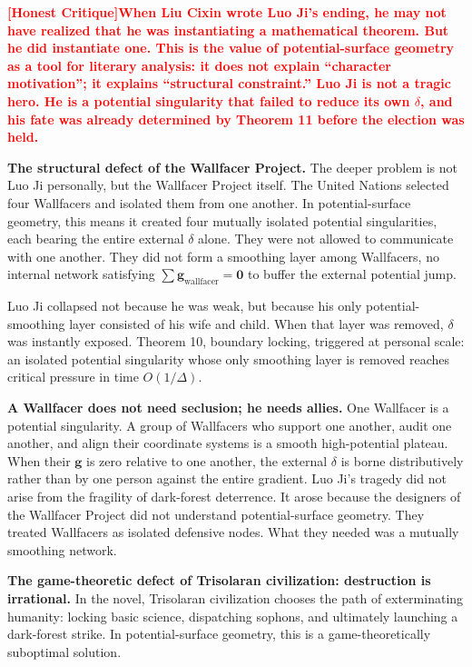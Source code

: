 \documentclass[12pt,a4paper]{article}
\theoremstyle{remark}
\newcommand{\honestcrit}[1]{%
    \textcolor{red}{\textbf{[Honest Critique]#1}}%
}
\begin{document}
\honestcrit{When Liu Cixin wrote Luo Ji's ending, he may not have realized that he was instantiating a mathematical theorem. But he did instantiate one. This is the value of potential-surface geometry as a tool for literary analysis: it does not explain ``character motivation''; it explains ``structural constraint.'' Luo Ji is not a tragic hero. He is a potential singularity that failed to reduce its own $\delta$, and his fate was already determined by Theorem 11 before the election was held.}

\textbf{The structural defect of the Wallfacer Project.} The deeper problem is not Luo Ji personally, but the Wallfacer Project itself. The United Nations selected four Wallfacers and isolated them from one another. In potential-surface geometry, this means it created four mutually isolated potential singularities, each bearing the entire external $\delta$ alone. They were not allowed to communicate with one another. They did not form a smoothing layer among Wallfacers, no internal network satisfying $\sum\mathbf{g}_{\text{wallfacer}} = \mathbf{0}$ to buffer the external potential jump.

Luo Ji collapsed not because he was weak, but because his only potential-smoothing layer consisted of his wife and child. When that layer was removed, $\delta$ was instantly exposed. Theorem 10, boundary locking, triggered at personal scale: an isolated potential singularity whose only smoothing layer is removed reaches critical pressure in time $O(1/\Delta)$.

\textbf{A Wallfacer does not need seclusion; he needs allies.} One Wallfacer is a potential singularity. A group of Wallfacers who support one another, audit one another, and align their coordinate systems is a smooth high-potential plateau. When their $\mathbf{g}$ is zero relative to one another, the external $\delta$ is borne distributively rather than by one person against the entire gradient. Luo Ji's tragedy did not arise from the fragility of dark-forest deterrence. It arose because the designers of the Wallfacer Project did not understand potential-surface geometry. They treated Wallfacers as isolated defensive nodes. What they needed was a mutually smoothing network.

\textbf{The game-theoretic defect of Trisolaran civilization: destruction is irrational.} In the novel, Trisolaran civilization chooses the path of exterminating humanity: locking basic science, dispatching sophons, and ultimately launching a dark-forest strike. In potential-surface geometry, this is a game-theoretically suboptimal solution.
\end{document}
